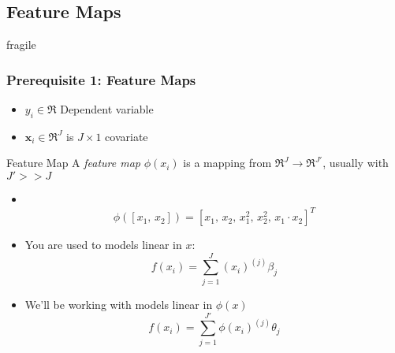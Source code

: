 \documentclass{beamer}
\numberwithin{equation}{section}
\begin{document}
\subsection{Feature Maps}
\begin{frame}{fragile}
\footnotesize{
\frametitle{Prerequisite 1: Feature Maps}

\begin{itemize}
\item $y_{i} \in \Re$ Dependent variable
\item $\boldsymbol{x}_{i} \in \Re^{J}$ is $J \times 1$ covariate 
\end{itemize}



\pause

\begin{block}{Feature Map}
A \textit{feature map} $\phi(x_i)$ is a mapping from $\Re^J \rightarrow \Re^{J'}$, usually with $J'>>J$ \\


\end{block}}
\begin{itemize}
\item<3->[] \vspace{-.1in}\hspace{-.2in}{For example,}\\
\vspace{-.2in}
$$ \phi([x_1, \, x_2])  =  [x_1,\, x_2, \, x_1^2,\, x_2^2, \, x_1\cdot x_2]^T $$
\item<4-> You are used to models linear in $x$:
$$f(x_i) = \sum_{j=1}^J (x_i)^{(j)} \beta_j $$
\item<5-> We'll be working with models linear in $\phi(x)$
$$f(x_i) = \sum_{j=1}^{J'} \phi(x_i)^{(j)} \theta_j$$
\end{itemize}
\end{frame}
\end{document}
